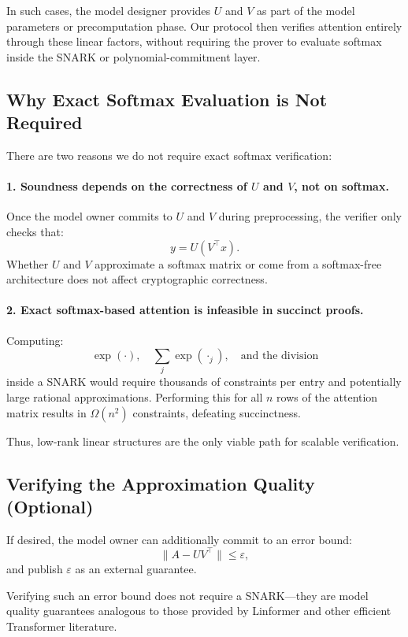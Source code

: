 \documentclass[11pt]{article}
\begin{document}
In such cases, the model designer provides $U$ and $V$ as part of the
model parameters or precomputation phase.  
Our protocol then verifies attention entirely through these linear
factors, without requiring the prover to evaluate softmax inside the
SNARK or polynomial-commitment layer.

\subsection{Why Exact Softmax Evaluation is Not Required}

There are two reasons we do not require exact softmax verification:

\paragraph{1. Soundness depends on the correctness of $U$ and $V$, not on softmax.}

Once the model owner commits to $U$ and $V$ during preprocessing, the
verifier only checks that:
\[
  y = U(V^\top x).
\]
Whether $U$ and $V$ approximate a softmax matrix or come from a
softmax-free architecture does not affect cryptographic correctness.

\paragraph{2. Exact softmax-based attention is infeasible in succinct proofs.}

Computing:
\[
  \exp(\cdot), \quad \sum_j \exp(\cdot_j), \quad \text{and the division}
\]
inside a SNARK would require thousands of constraints per entry and
potentially large rational approximations.  
Performing this for all $n$ rows of the attention matrix results in
$\Omega(n^2)$ constraints, defeating succinctness.

Thus, low-rank linear structures are the only viable path for scalable
verification.

\subsection{Verifying the Approximation Quality (Optional)}

If desired, the model owner can additionally commit to an error bound:
\[
  \| A - UV^\top \| \le \varepsilon,
\]
and publish $\varepsilon$ as an external guarantee.

Verifying such an error bound does not require a SNARK—they are model
quality guarantees analogous to those provided by Linformer and other
efficient Transformer literature.
\end{document}
